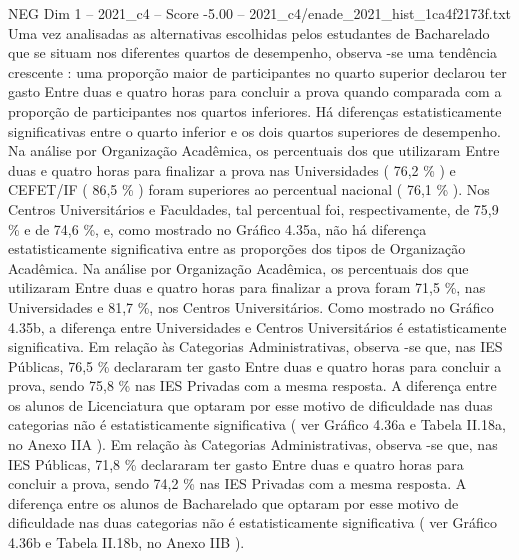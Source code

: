 \begin{textsample}{NEG Dim 1 – 2021\_c4 – Score -5.00 – 2021\_c4/enade\_2021\_hist\_1ca4f2173f.txt}
Uma vez analisadas as alternativas escolhidas pelos estudantes de Bacharelado que se situam nos diferentes quartos de desempenho, observa -se uma tendência crescente : uma proporção maior de participantes no quarto superior declarou ter gasto Entre duas e quatro horas para concluir a prova quando comparada com a proporção de participantes nos quartos inferiores.
Há diferenças estatisticamente significativas entre o quarto inferior e os dois quartos superiores de desempenho.
Na análise por Organização Acadêmica, os percentuais dos que utilizaram Entre duas e quatro horas para finalizar a prova nas Universidades ( 76,2 \% ) e CEFET/IF ( 86,5 \% ) foram superiores ao percentual nacional ( 76,1 \% ).
Nos Centros Universitários e Faculdades, tal percentual foi, respectivamente, de 75,9 \% e de 74,6 \%, e, como mostrado no Gráfico 4.35a, não há diferença estatisticamente significativa entre as proporções dos tipos de Organização Acadêmica.
Na análise por Organização Acadêmica, os percentuais dos que utilizaram Entre duas e quatro horas para finalizar a prova foram 71,5 \%, nas Universidades e 81,7 \%, nos Centros Universitários.
Como mostrado no Gráfico 4.35b, a diferença entre Universidades e Centros Universitários é estatisticamente significativa.
Em relação às Categorias Administrativas, observa -se que, nas IES Públicas, 76,5 \% declararam ter gasto Entre duas e quatro horas para concluir a prova, sendo 75,8 \% nas IES Privadas com a mesma resposta.
A diferença entre os alunos de Licenciatura que optaram por esse motivo de dificuldade nas duas categorias não é estatisticamente significativa ( ver Gráfico 4.36a e Tabela II.18a, no Anexo IIA ).
Em relação às Categorias Administrativas, observa -se que, nas IES Públicas, 71,8 \% declararam ter gasto Entre duas e quatro horas para concluir a prova, sendo 74,2 \% nas IES Privadas com a mesma resposta.
A diferença entre os alunos de Bacharelado que optaram por esse motivo de dificuldade nas duas categorias não é estatisticamente significativa ( ver Gráfico 4.36b e Tabela II.18b, no Anexo IIB ).

\end{textsample}
